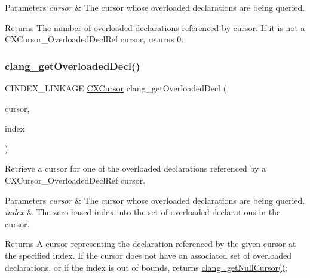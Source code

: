 \begin{DoxyParams}{Parameters}
{\em cursor} & The cursor whose overloaded declarations are being queried.\\
\hline
\end{DoxyParams}
\begin{DoxyReturn}{Returns}
The number of overloaded declarations referenced by {\ttfamily cursor}. If it is not a {\ttfamily C\+X\+Cursor\+\_\+\+Overloaded\+Decl\+Ref} cursor, returns 0. 
\end{DoxyReturn}
\mbox{\label{group__CINDEX__TYPES_gab1c718b939700a6c23adfb9729c9c28f}} 
\subsubsection{\texorpdfstring{clang\+\_\+get\+Overloaded\+Decl()}{clang\_getOverloadedDecl()}}
{\footnotesize\ttfamily C\+I\+N\+D\+E\+X\+\_\+\+L\+I\+N\+K\+A\+GE \hyperlink{structCXCursor}{C\+X\+Cursor} clang\+\_\+get\+Overloaded\+Decl (\begin{DoxyParamCaption}\item[{\hyperlink{structCXCursor}{C\+X\+Cursor}}]{cursor,  }\item[{unsigned}]{index }\end{DoxyParamCaption})}



Retrieve a cursor for one of the overloaded declarations referenced by a {\ttfamily C\+X\+Cursor\+\_\+\+Overloaded\+Decl\+Ref} cursor. 


\begin{DoxyParams}{Parameters}
{\em cursor} & The cursor whose overloaded declarations are being queried.\\
\hline
{\em index} & The zero-\/based index into the set of overloaded declarations in the cursor.\\
\hline
\end{DoxyParams}
\begin{DoxyReturn}{Returns}
A cursor representing the declaration referenced by the given {\ttfamily cursor} at the specified {\ttfamily index}. If the cursor does not have an associated set of overloaded declarations, or if the index is out of bounds, returns {\ttfamily \hyperlink{group__CINDEX__CURSOR__MANIP_ga94d81bbf40dff4ac843458d018f3138e}{clang\+\_\+get\+Null\+Cursor()}}; 
\end{DoxyReturn}
\mbox{\label{group__CINDEX__TYPES_ga39b4850746f39e17c6b8b4eef3154d85}} 
